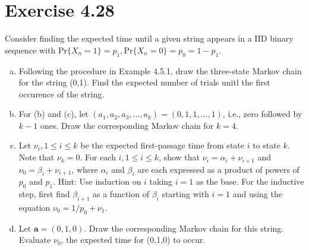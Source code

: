 \documentclass{article}
\begin{document}
    \section{Exercise 4.28}
    Consider finding the expected time until a given string appears in a IID binary sequence with $\text{Pr}\{X_n=1\}=p_1,\text{Pr}\{X_n=0\}=p_0=1-p_1$.
    \begin{enumerate}[(a)]
        \item Following the procedure in Example 4.5.1, draw the three-state Markov chain for the string (0,1). Find the expected number of trials unitl the first occurence of the string.
        \item For (b) and (c), let $(a_1,a_2,a_3,\dots,a_k)=(0,1,1,\dots,1)$, i.e., zero followed by $k-1$ ones. Draw the corresponding Markov chain for $k=4$.
        \item Let $\nu_i,1\leq i\leq k$ be the expected first-passage time from state $i$ to state $k$. Note that $\nu_k=0$. For each $i, 1\leq i\leq k$, show that $\nu_i=\alpha_i+\nu_{{i+1}}$ and $\nu_0=\beta_i+\nu_{i+1}$, where $\alpha_i$ and $\beta_i$ are each expressed as a product of powers of $p_0$ and $p_1$. Hint: Use induction on $i$ taking $i=1$ as the base. For the inductive step, first find $\beta_{i+1}$ as a function of $\beta_i$ starting with $i=1$ and using the equation $\nu_0=1/p_0+\nu_1$.
        \item Let $\bm{a}=(0,1,0)$. Draw the corresponding Markov chain for this string. Evaluate $\nu_0$, the expected time for (0,1,0) to occur. 
    \end{enumerate}
\end{document}

